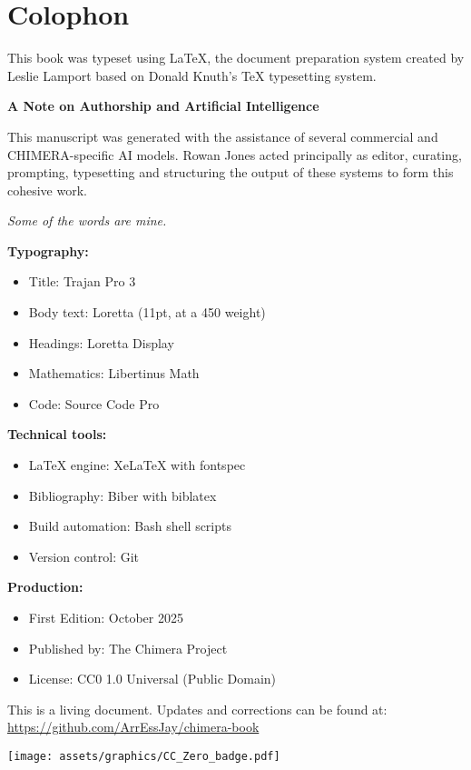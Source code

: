 
\chapter*{Colophon}

This book was typeset using \LaTeX{}, the document preparation system created by Leslie Lamport based on Donald Knuth's \TeX{} typesetting system.

\vspace{1cm}

\textbf{A Note on Authorship and Artificial Intelligence}

\vspace{0.5cm}

This manuscript was generated with the assistance of several commercial and CHIMERA-specific AI models. Rowan Jones acted principally as editor, curating, prompting, typesetting and structuring the output of these systems to form this cohesive work.

\vspace{0.5cm}

\textit{Some of the words are mine.}

\vspace{1.5cm}

\textbf{Typography:}
\begin{itemize}
\item Title: Trajan Pro 3
\item Body text: Loretta (11pt, at a 450 weight)
\item Headings: Loretta Display
\item Mathematics: Libertinus Math
\item Code: Source Code Pro
\end{itemize}

\textbf{Technical tools:}
\begin{itemize}
\item \LaTeX{} engine: Xe\LaTeX{} with fontspec
\item Bibliography: Biber with biblatex
\item Build automation: Bash shell scripts
\item Version control: Git
\end{itemize}

\textbf{Production:}
\begin{itemize}
\item First Edition: October 2025
\item Published by: The Chimera Project
\item License: CC0 1.0 Universal (Public Domain)
\end{itemize}

This is a living document. Updates and corrections can be found at:\\
\url{https://github.com/ArrEssJay/chimera-book}

\vspace{2cm}
\begin{center}
\texttt{[image: assets/graphics/CC\_Zero\_badge.pdf]}
\end{center}
